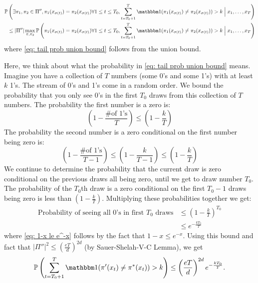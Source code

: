 \documentclass[11pt]{article}
\begin{document}
\begin{align}\label{eq: tail probability 4}
\prob{\exists \pi_1,\pi_2 \in \Pi'', \pi_1(x_{\sigma(t)})= \pi_2(x_{\sigma(t)}) \forall 1 \le t \le T_0, \sum_{t=T_0+1}^T \ind(\pi_1(x_{\sigma(t)})\neq \pi_2(x_{\sigma(t)})) > k\;\Big|\;x_1,\ldots,x_T} \\
\le |\Pi''|\max_{\pi,\pi_2} \prob{\pi_1(x_{\sigma(t)})= \pi_2(x_{\sigma(t)}) \forall 1 \le t \le T_0, \sum_{t=T_0+1}^T \ind(\pi_1(x_{\sigma(t)})\neq \pi_2(x_{\sigma(t)})) > k\;\Big|\;x_1,\ldots,x_T}\label{eq: tail prob union bound}
\end{align} 
where \eqref{eq: tail prob union bound} follows from the union bound. 

Here, we think about what the probability in \eqref{eq: tail prob union bound} means. Imagine you have a collection of $T$ numbers (some 0's and some 1's) with at least $k$ 1's. The stream of 0's and 1's come in a random order. We bound the probability that you only see 0's in the first $T_0$ draws from this collection of $T$ numbers. The probability the first number is a zero is:
\begin{equation}
(1-\frac{\text{\# of 1's}}{T}) \le (1- \frac{k}{T})
\end{equation}
The probability the second number is a zero conditional on the first number being zero is:
\begin{equation}
(1-\frac{\text{\# of 1's}}{T-1}) \le (1-\frac{k}{T-1}) \le (1 - \frac{k}{T})
\end{equation}
We continue to determine the probability that the current draw is zero conditional on the previous draws all being zero, until we get to draw number $T_0$. The probability of the $T_0${th} draw is a zero conditional on the first $T_0-1$ draws being zero is less than $(1-\frac{k}{T})$. Multiplying these probabilities together we get:
\begin{align}
\text{Probability of seeing all 0's in first } T_0 \text{ draws} &\le (1-\frac{k}{T})^{T_0}\\
&\le e^{-\frac{kT_0}{T}} \label{eq: 1-x le e^-x}
\end{align}
where \eqref{eq: 1-x le e^-x} follows by the fact that $1-x \le e^{-x}$.
Using this bound and fact that $|\Pi''|^2 \le (\frac{eT}{d})^{2d}$ (by Sauer-Shelah-V-C Lemma), we get
\begin{equation}\label{eq:tailboundfinal}
\prob{\sum_{t=T_0+1}^T\ind(\pi'(x_t)\neq \pi^*(x_t))>k} \le \left(\frac{eT}{d}\right)^{2d} e^{-\frac{kT_0}{T}} .
\end{equation}
\end{document}
